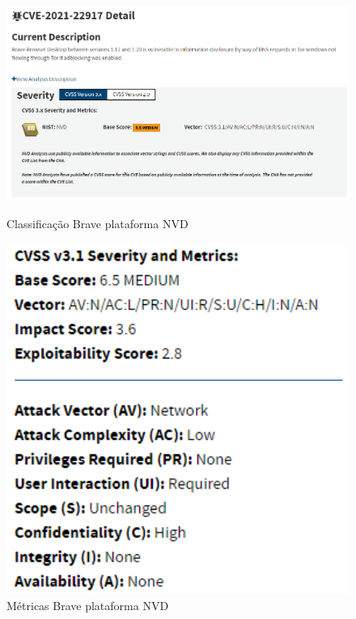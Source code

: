 \documentclass[11t]{article}
\begin{document}
\begin{figure}[H]
    \centering
    \begin{minipage}{0.62\textwidth}
        \centering
        \includegraphics[width=1\textwidth]{images/classificacaoBrave.png}
        \caption{Classificação Brave plataforma NVD}
    \end{minipage}
    \hfill
    \begin{minipage}{0.36\textwidth}
        \centering
        \includegraphics[width=1\textwidth]{images/metricasBrave.png}
        \caption{Métricas Brave plataforma NVD}
    \end{minipage}
\end{figure}
\end{document}
